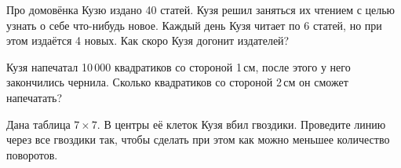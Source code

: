 ﻿
\begin{itemize}

\itA Про домовёнка Кузю издано 40 статей. Кузя решил заняться их чтением с целью узнать о себе что-нибудь новое. Каждый день Кузя читает по 6 статей, но при этом издаётся 4 новых. Как скоро Кузя догонит издателей?

\itB Кузя напечатал 10\,000 квадратиков со стороной 1\,см, после этого у него закончились чернила. Сколько квадратиков со стороной 2\,см он сможет напечатать?

\itC Дана таблица $7 \times 7$. В центры её клеток Кузя вбил гвоздики. Проведите линию через все гвоздики так, чтобы сделать при этом как можно меньшее количество поворотов.
\end{itemize}